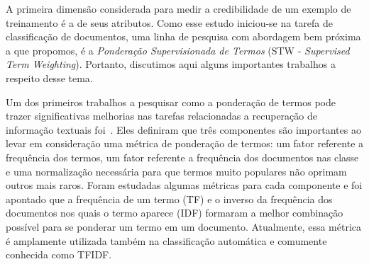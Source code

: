 A primeira dimensão considerada para medir a credibilidade de um exemplo de treinamento é a de seus atributos. Como esse estudo iniciou-se na tarefa de classificação de documentos, uma linha de pesquisa com abordagem bem próxima a que propomos, é a \textit{Ponderação Supervisionada de Termos} (\textsc{STW} - \textit{Supervised Term Weighting}). Portanto, discutimos aqui alguns importantes trabalhos a respeito desse tema.

Um dos primeiros trabalhos a pesquisar como a ponderação de termos pode trazer significativas melhorias nas tarefas relacionadas a recuperação de informação textuais foi~\cite{Salton88}.
Eles definiram que três componentes são importantes ao levar em consideração uma métrica de ponderação de termos: um fator referente a frequência dos termos, um fator referente a frequência dos documentos nas classe e uma normalização necessária para que termos muito populares não oprimam outros mais raros.
Foram estudadas algumas métricas para cada componente e foi apontado que a frequência de um termo (\textsc{TF}) e o inverso da frequência dos documentos nos quais o termo aparece (\textsc{IDF}) formaram a melhor combinação possível para se ponderar um termo em um documento. 
Atualmente, essa métrica é amplamente utilizada também na classificação automática e comumente conhecida como \textsc{TFIDF}.

